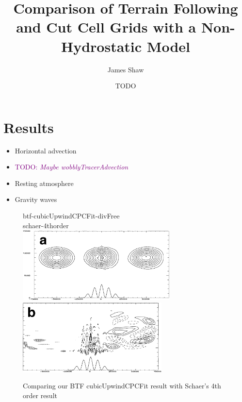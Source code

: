 \documentclass[a4paper]{article}
\title{Comparison of Terrain Following and Cut Cell Grids with a Non-Hydrostatic Model}
\author{James Shaw}
\date{TODO}
\begin{document}
\newcommand{\TODO}[1]{\textcolor{purple}{TODO: \emph{#1}}}
\newcommand{\textcite}[1]{\textbf{#1}}

\maketitle

\section{Results}

\begin{itemize}
	\item Horizontal advection
	\item \TODO{Maybe wobblyTracerAdvection}
	\item Resting atmosphere
	\item Gravity waves
\end{itemize}

\begin{figure}
	btf-cubicUpwindCPCFit-divFree \\
	
	

	schaer-4thorder \\
	\includegraphics[height=1.5in]{schaer-btf-4thorder.png}
	\includegraphics[height=1.5in]{schaer-btf-4thorder-error.png}
%
	\caption{Comparing our BTF cubicUpwindCPCFit result with Schaer's 4th order result}
	\label{fig:advection}
\end{figure}
\end{document}
